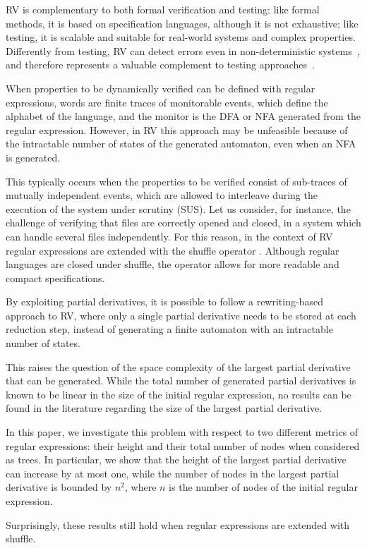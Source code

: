 RV is complementary to both formal verification and testing: like formal methods, it is based on specification languages, although it is not exhaustive; like testing, it is scalable and suitable for real-world systems and complex properties. Differently from testing, RV can detect errors even in non-deterministic systems~\cite{HavelundRosu2004,SharmaEtAl2009,TowardsIoT17,SchiavioEtAl19}, and therefore represents a valuable complement to testing approaches~\cite{BesnardEtAl23}.

When properties to be dynamically verified can be defined with regular expressions, words are finite traces of monitorable events, which define the alphabet of the language, and the monitor is the DFA or NFA generated from the regular expression. However, in RV this approach may be unfeasible because of the intractable number of states of the generated automaton, even when an NFA is generated.

This typically occurs when the properties to be verified consist of sub-traces of mutually independent events, which are allowed to interleave during the execution of the system under scrutiny (SUS). Let us consider, for instance, the challenge of verifying that files are correctly opened and closed, in a system which can handle several files independently. For this reason, in the context of RV regular expressions are extended with the shuffle operator \cite{RML2021}. Although regular languages are closed under shuffle, the operator allows for more readable and compact specifications.

By exploiting partial derivatives, it is possible to follow a rewriting-based approach to RV, where only a single partial derivative needs to be stored at each reduction step, instead of generating a finite automaton with an intractable number of states.

This raises the question of the space complexity of the largest partial derivative that can be generated. While the total number of generated partial derivatives is known to be linear in the size of the initial regular expression, no results can be found in the literature regarding the size of the largest partial derivative.

In this paper, we investigate this problem with respect to two different metrics of regular expressions: their height and their total number of nodes when considered as trees. In particular, we show that the height of the largest partial derivative can increase by at most one, while the number of nodes in the largest partial derivative is bounded by $n^2$, where $n$ is the number of nodes of the initial regular expression.

Surprisingly, these results still hold when regular expressions are extended with shuffle.